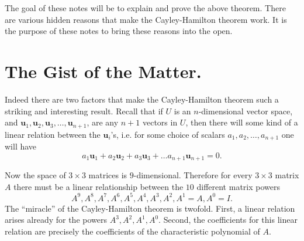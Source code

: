 \documentclass[12pt]{article}
\newcommand{\vu}{\mathbf{u}}
\begin{document}
 The goal of these notes will be to explain and prove the above
 theorem.  There are various hidden reasons that make the
 Cayley-Hamilton theorem work.  It is the purpose of these notes to
 bring these reasons into the open.

 \section{The Gist of the Matter.}

 Indeed there are two factors that make the Cayley-Hamilton theorem
 such a striking and interesting result.  Recall that if $U$ is an
 $n$-dimensional vector space, and $\vu_1, \vu_2, \vu_3, \ldots ,
 \vu_{n+1}$, are any $n+1$ vectors in $U$, then there will some kind of
 a linear relation between the $\vu_i$'s, i.e. for some choice of
 scalars $a_1, a_2, \ldots , a_{n+1}$ one will have
 $$a_1 \vu_1+a_2\vu_2+a_3\vu_3 + \ldots a_{n+1}\vu_{n+1}=0.$$

 Now the space of $3\times 3$ matrices is $9$-dimensional.  Therefore
 for every $3\times 3$ matrix $A$ there must be a linear relationship
 between the $10$ different matrix powers
 $$A^9, A^8, A^7, A^6, A^5, A^4, A^3, A^2, A^1=A, A^0=I.$$
 The ``miracle'' of the Cayley-Hamilton theorem is twofold.  First, a
 linear relation arises already for the powers $A^3, A^2, A^1, A^0$.
 Second, the coefficients for this linear relation are precisely the
 coefficients of the characteristic polynomial of $A$.
\end{document}
